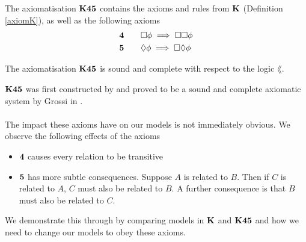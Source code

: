 \begin{lemma} \label{axiomK45}
The axiomatisation $\bf K45$ contains the axioms and rules from $\bf K$ (Definition
    \ref{axiomK}), as well as the following axioms
\begin{alignat*}{2}
  & \bf 4 && \quad \Box \phi \implies \Box \Box \phi \\
  & \bf 5 && \quad \Diamond \phi \implies \Box \Diamond \phi
\end{alignat*}
\end{lemma}

\begin{lemma} \label{axiomK45SoundComplete}
The axiomatisation $\bf K45$ is sound and complete with respect to the logic
$\lang$.
\end{lemma}

$\bf K45$ was first constructed by \FIXME and proved to be a sound and complete axiomatic
system by Grossi in \cite{grossi2007designing}.\\
\\
The impact these axioms have on our models is not immediately obvious.
We observe the following effects of the axioms
\begin{itemize}
	\item $\bf 4$ causes every relation to be transitive
	\item $\bf 5$ has more subtle consequences.
    Suppose $A$ is related to $B$.
    Then if $C$ is related to $A$, $C$ must also be related to $B$.
    A further consequence is that $B$ must also be related to $C$.
\end{itemize}

We demonstrate this through by comparing models in $\bf K$ and $\bf K45$ and how we need to change
our models to obey these axioms.

